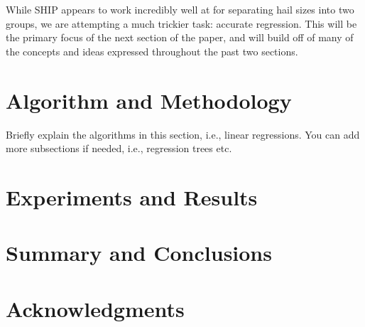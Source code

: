 \documentclass[fleqn,10pt]{SelfArx} %
\begin{document}
While SHIP appears to work incredibly well at for separating hail sizes into two groups, we are attempting a much trickier task: accurate regression. This will be the primary focus of the next section of the paper, and will build off of many of the concepts and ideas expressed throughout the past two sections.


\bigskip
\bigskip


\section{Algorithm and Methodology}

Briefly explain the algorithms in this section, i.e., linear regressions. You can add more subsections if needed, i.e., regression trees etc.


\bigskip
\bigskip
\section{Experiments and Results}


\bigskip
\bigskip
\section{Summary and Conclusions}
\bigskip
\bigskip
\bigskip



\section*{Acknowledgments} %







\end{document}
